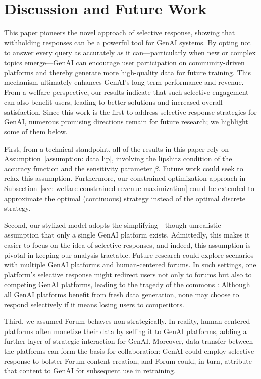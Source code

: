\section{Discussion and Future Work}\label{sec:discussion}
This paper pioneers the novel approach of selective response, showing that withholding responses can be a powerful tool for GenAI systems. By opting not to answer every query as accurately as it can---particularly when new or complex topics emerge---GenAI can encourage user participation on community-driven platforms and thereby generate more high-quality data for future training. This mechanism ultimately enhances GenAI's long-term performance and revenue. From a welfare perspective, our results indicate that such selective engagement can also benefit users, leading to better solutions and increased overall satisfaction. Since this work is the first to address selective response strategies for GenAI, numerous promising directions remain for future research; we highlight some of them below. 

First, from a technical standpoint, all of the results in this paper rely on Assumption~\ref{assumption: data lip}, involving the lipshitz condition of the accuracy function and the sensitivity parameter $\beta$. Future work could seek to relax this assumption. Furthermore, our constrained optimization approach in Subsection~\ref{sec: welfare constrained revenue maximization} could be extended to approximate the optimal (continuous) strategy instead of the optimal discrete strategy.

Second, our stylized model adopts the simplifying---though unrealistic---assumption that only a single GenAI platform exists. Admittedly, this makes it easier to focus on the idea of selective responses, and indeed, this assumption is pivotal in keeping our analysis tractable. Future research could explore scenarios with multiple GenAI platforms and human-centered forums. In such settings, one platform's selective response might redirect users not only to forums but also to competing GenAI platforms, leading to the tragedy of the commons \cite{hardin1968tragedy}: Although all GenAI platforms benefit from fresh data generation, none may choose to respond selectively if it means losing users to competitors. 

Third, we assumed Forum behaves non-strategically. In reality, human-centered platforms often monetize their data by selling it to GenAI platforms, adding a further layer of strategic interaction for GenAI. Moreover, data transfer between the platforms can form the basis for collaboration: GenAI could employ selective response to bolster Forum content creation, and Forum could, in turn, attribute that content to GenAI for subsequent use in retraining.



